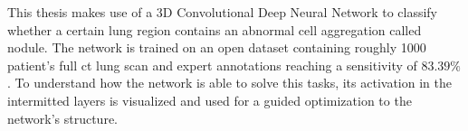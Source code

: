 \documentclass[main.tex]{subfiles}
\begin{document}
This thesis makes use of a 3D Convolutional Deep Neural Network to classify whether a certain lung region contains an abnormal cell aggregation called nodule. The network is trained on an open dataset containing roughly 1000 patient's full ct lung scan and expert annotations reaching a sensitivity of $83.39\%$. To understand how the network is able to solve this tasks, its activation in the intermitted layers is visualized and used for a guided optimization to the network's structure.
\end{document}
